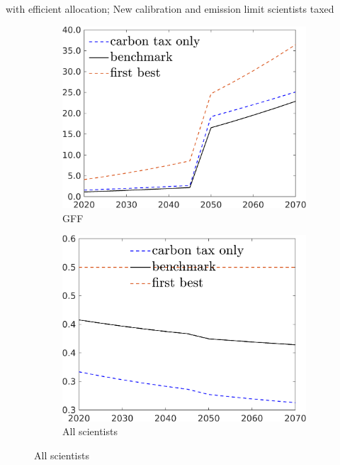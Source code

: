 \documentclass[11pt,aspectratio=169]{beamer}
\begin{document}
\begin{frame}{with efficient allocation; New calibration and emission limit scientists taxed}
	\begin{figure}[h!!]
		\centering
		\begin{subfigure}{0.3\textwidth}		
			\caption{{GFF}}
			\includegraphics[width=1\textwidth]{../codding_model/own_basedOnFried/optimalPol_010922_revision/figures/all_13Sept22/NewCalib_eff2pol_T_GFF_Sun2_emnet1_spillover0_knspil3_xgr0_nsk0_sep0_extern0_PV1_etaa0.79_lgd1.png}
		\end{subfigure}
		\begin{subfigure}{0.3\textwidth}		
			\caption{{All scientists}}
			\includegraphics[width=1\textwidth]{../codding_model/own_basedOnFried/optimalPol_010922_revision/figures/all_13Sept22/NewCalib_eff2pol_T_S_Sun2_emnet1_spillover0_knspil3_xgr0_nsk0_sep0_extern0_PV1_etaa0.79_lgd1.png}

\end{subfigure}
\end{figure}
\end{frame}
\end{document}
